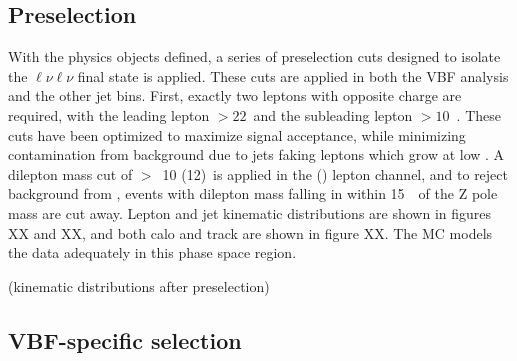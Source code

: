 \subsection{Preselection}

With the physics objects defined, a series of preselection cuts
designed to isolate the $\ell\nu\ell\nu$ final state is applied. These
cuts are applied in both the VBF analysis and the other jet
bins. First, exactly two leptons with opposite charge are required,
with the leading lepton \pt$>22$~\gev and the subleading lepton
\pt$>10$~\gev. These cuts have been optimized to maximize signal
acceptance, while minimizing contamination from background due to jets
faking leptons which grow at low \pt. A dilepton mass cut of
\mll$>$~10 (12)~\gev is applied in the \emme (\eemm) lepton channel,
and to reject background from \ZDY, events with dilepton mass falling
in within 15~\gev~of the Z pole mass are cut away. Lepton and jet
kinematic distributions are shown in figures XX and XX, and both calo
and track \etmiss are shown in figure XX. The MC models the data
adequately in this phase space region. 

(kinematic distributions after preselection)

\subsection{VBF-specific selection}


